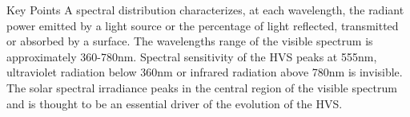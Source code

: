 Key Points
A spectral distribution characterizes, at each wavelength, the radiant power emitted by a light source or the percentage of light reflected, transmitted or absorbed by a surface.
The wavelengths range of the visible spectrum is approximately 360-780nm.
Spectral sensitivity of the HVS peaks at 555nm, ultraviolet radiation below 360nm or infrared radiation above 780nm is invisible.
The solar spectral irradiance peaks in the central region of the visible spectrum and is thought to be an essential driver of the evolution of the HVS.


